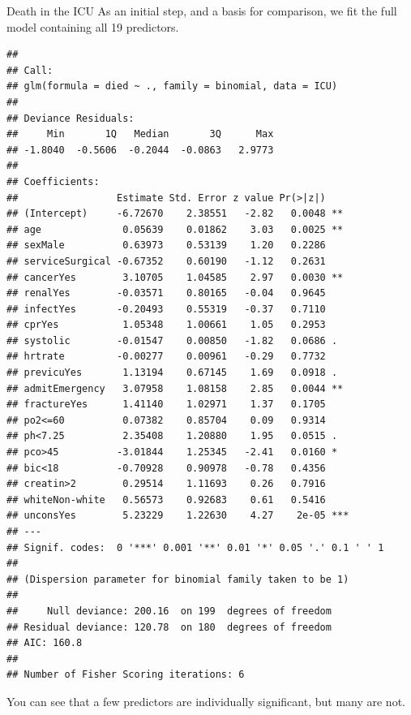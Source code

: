 \documentclass[11pt]{book}
\renewenvironment{knitrout}{\small\renewcommand{\baselinestretch}{.85}}{} %
\begin{document}
\begin{Example}[icu1]{Death in the ICU}
As an initial step, and a basis for comparison, we fit the full model
containing all 19 predictors.  
\begin{knitrout}
\color{fgcolor}\begin{kframe}
\begin{alltt}
 \hlkwb{<-}  \hlopt{~}   
\end{alltt}
\begin{verbatim}
## 
## Call:
## glm(formula = died ~ ., family = binomial, data = ICU)
## 
## Deviance Residuals: 
##     Min       1Q   Median       3Q      Max  
## -1.8040  -0.5606  -0.2044  -0.0863   2.9773  
## 
## Coefficients:
##                 Estimate Std. Error z value Pr(>|z|)    
## (Intercept)     -6.72670    2.38551   -2.82   0.0048 ** 
## age              0.05639    0.01862    3.03   0.0025 ** 
## sexMale          0.63973    0.53139    1.20   0.2286    
## serviceSurgical -0.67352    0.60190   -1.12   0.2631    
## cancerYes        3.10705    1.04585    2.97   0.0030 ** 
## renalYes        -0.03571    0.80165   -0.04   0.9645    
## infectYes       -0.20493    0.55319   -0.37   0.7110    
## cprYes           1.05348    1.00661    1.05   0.2953    
## systolic        -0.01547    0.00850   -1.82   0.0686 .  
## hrtrate         -0.00277    0.00961   -0.29   0.7732    
## previcuYes       1.13194    0.67145    1.69   0.0918 .  
## admitEmergency   3.07958    1.08158    2.85   0.0044 ** 
## fractureYes      1.41140    1.02971    1.37   0.1705    
## po2<=60          0.07382    0.85704    0.09   0.9314    
## ph<7.25          2.35408    1.20880    1.95   0.0515 .  
## pco>45          -3.01844    1.25345   -2.41   0.0160 *  
## bic<18          -0.70928    0.90978   -0.78   0.4356    
## creatin>2        0.29514    1.11693    0.26   0.7916    
## whiteNon-white   0.56573    0.92683    0.61   0.5416    
## unconsYes        5.23229    1.22630    4.27    2e-05 ***
## ---
## Signif. codes:  0 '***' 0.001 '**' 0.01 '*' 0.05 '.' 0.1 ' ' 1
## 
## (Dispersion parameter for binomial family taken to be 1)
## 
##     Null deviance: 200.16  on 199  degrees of freedom
## Residual deviance: 120.78  on 180  degrees of freedom
## AIC: 160.8
## 
## Number of Fisher Scoring iterations: 6
\end{verbatim}
\end{kframe}
\end{knitrout}
\noindent You can see that a few predictors are individually significant, but many are not.


\end{Example}
\end{document}
